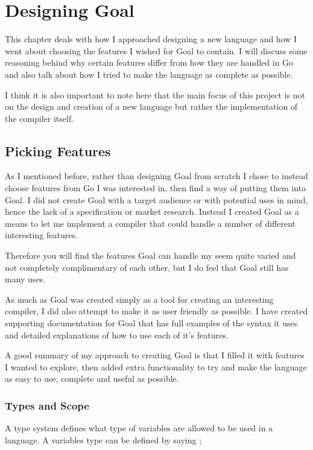 \chapter{Designing Goal}

This chapter deals with how I approached designing a new language and how I went about choosing the features I wished for Goal to contain. I will discuss some reasoning behind why certain features differ from how they are handled in Go and also talk about how I tried to make the language as complete as possible.

I think it is also important to note here that the main focus of this project is not on the design and creation of a new language but rather the implementation of the compiler itself.

\section{Picking Features}

As I mentioned before, rather than designing Goal from scratch I chose to instead choose features from Go I was interested in, then find a way of putting them into Goal. I did not create Goal with a target audience or with potential uses in mind, hence the lack of a specification or market research. Instead I created Goal as a means to let me implement a compiler that could handle a number of different interesting features.

Therefore you will find the features Goal can handle my seem quite varied and not completely complimentary of each other, but I do feel that Goal still has many uses. 

As much as Goal was created simply as a tool for creating an interesting compiler, I did also attempt to make it as user friendly as possible. I have created supporting documentation for Goal that has full examples of the syntax it uses and detailed explanations of how to use each of it's features.  
 
A good summary of my approach to creating Goal is that I filled it with features I wanted to explore, then added extra functionality to try and make the language as easy to use, complete and useful as possible.
 
\subsection{Types and Scope}

A type system defines what type of variables are allowed to be used in a language. A variables type can be defined by saying \cite[p.~164]{EngComp2012};

